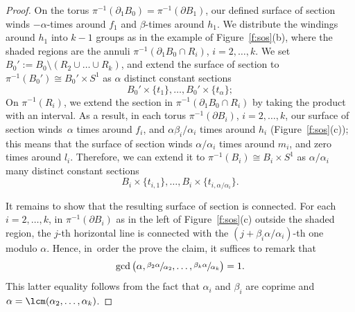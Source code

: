 \begin{proof}
On the torus $\pi^{-1}(\partial_1 B_0)=\pi^{-1}(\partial B_1)$, our defined surface of section winds $- \alpha$\nobreakdash-times around $f_1$ and $ \beta$-times around $h_1$. We distribute the windings around $h_1$ into $k-1$ groups as in the example of Figure~\ref{f:sos}(b), where the shaded regions are the annuli $\pi^{-1}(\partial_1 B_0 \cap R_i)$, $i=2,\dots,k$. We set $B_0':=B_0\setminus (R_2\cup\dots\cup R_k)$, and extend the surface of section to $\pi^{-1}(B_0')\cong B_0'\times S^1$ as $\alpha$ distinct constant sections
\[
B_0'\times\{t_1\},\dots, B_0'\times\{t_{\alpha}\};
\]
\Changel
On $\pi^{-1}(R_i)$, we extend the section in $\pi^{-1}(\partial_1 B_0 \cap R_i)$ by taking the product with an interval. As a result, in each torus $\pi^{-1}(\partial B_i)$, $i=2,\dots,k$, our surface of section winds~$\alpha$ times around $f_i$, and $\alpha\beta_i/\alpha_i$ times around $h_i$ (Figure~\ref{f:sos}(c)); this means that the surface of section winds $\alpha/\alpha_i$ times around $m_i$, and zero times around $l_i$. Therefore, we can extend it to $\pi^{-1}(B_i)\cong B_i\times S^1$ as $\alpha/\alpha_i$ many distinct constant sections\Changelback
\[
B_i\times\{t_{i,1}\},\dots,B_i\times\{t_{i,\alpha/\alpha_i}\}.
\]

It remains to show that the resulting surface of section is connected. For each $i=2,\dots,k$, in $\pi^{-1}(\partial B_i)$ as in the left of Figure~\ref{f:sos}(c) outside the shaded region, the $j$-th horizontal line is connected with the $(j+ \beta_i\alpha/\alpha_i)$-th one modulo $\alpha$. Hence, in~order the prove the claim, it suffices to remark that
\[
\gcd\big( \alpha, \sfrac{\beta_2 \alpha}{\alpha_2},\dots, \sfrac{\beta_k \alpha}{\alpha_k}\big) = 1.
\]
This latter equality follows from the fact that $\alpha_i$ and $\beta_i$ are coprime and $ \alpha=\lcm(\alpha_2,\dots,\alpha_k)$.
\end{proof}

